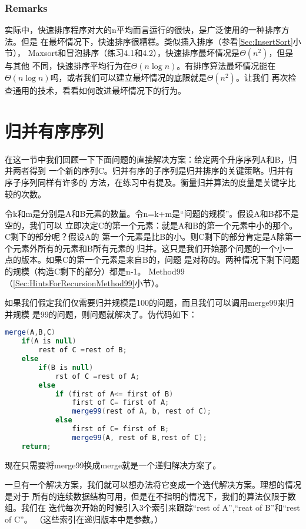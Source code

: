 \subsubsection{Remarks}
实际中，快速排序程序对大的n平均而言运行的很快，是广泛使用的一种排序方法。但是
在最坏情况下，快速排序很糟糕。类似插入排序（参看\ref{Sec:InsertSort}小节），
Maxsort和冒泡排序（练习4.1和4.2），快速排序最坏情况是$\Theta(n^2)$，但是与其他
不同，快速排序平均行为在$\Theta(n\log n)$。有排序算法最坏情况能在
$\Theta(n\log n)$吗，或者我们可以建立最坏情况的底限就是$\Theta(n^2)$。让我们
再次检查通用的技术，看看如何改进最坏情况下的行为。

\section{归并有序序列}
在这一节中我们回顾一下下面问题的直接解决方案：给定两个升序序列A和B，归并两者得到
一个新的序列C。归并有序的子序列是归并排序的关键策略。归并有序子序列同样有许多的
方法，在练习中有提及。衡量归并算法的度量是关键字比较的次数。

令k和m是分别是A和B元素的数量。令n=k+m是“问题的规模”。假设A和B都不是空的，我们可以
立即决定C的第一个元素：就是A和B的第一个元素中小的那个。C剩下的部分呢？假设A的
第一个元素是比B的小。则C剩下的部分肯定是A除第一个元素外所有的元素和B所有元素的
归并。这只是我们开始那个问题的一个小一点的版本。如果C的第一个元素是来自B的，问题
是对称的。两种情况下剩下问题的规模（构造C剩下的部分）都是n-1。
Method99（\ref{Sec:HintsForRecursionMethod99}小节）。

如果我们假定我们仅需要归并规模是100的问题，而且我们可以调用merge99来归并规模
是99的问题，则问题就解决了。伪代码如下：
\begin{lstlisting}[language={Java},keywordstyle=\color{blue!70}, commentstyle=\color{red!50!green!50!blue!50}]
merge(A,B,C)
    if(A is null)
        rest of C =rest of B;
    else
        if(B is null)
            rst of C =rest of A;
        else
            if (first of A<= first of B)
                first of C= first of A;
                merge99(rest of A, b, rest of C);
            else
                first of C= first of B;
                merge99(A, rest of B,rest of C);
    return;
\end{lstlisting}

现在只需要将merge99换成merge就是一个递归解决方案了。

一旦有一个解决方案，我们就可以想办法将它变成一个迭代解决方案。理想的情况是对于
所有的连续数据结构可用，但是在不指明的情况下，我们的算法仅限于数组。我们在
迭代每次开始的时候引入3个索引来跟踪“rest of A”,“reat of B”和“rest of C”。
（这些索引在递归版本中是参数。）

